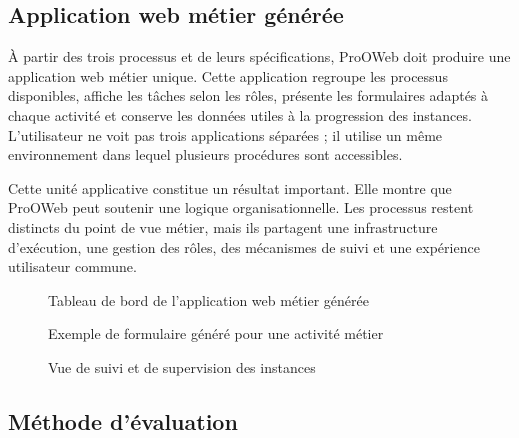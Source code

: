\subsection{Application web métier générée}

À partir des trois processus et de leurs spécifications, ProOWeb doit produire une application web métier unique. Cette application regroupe les processus disponibles, affiche les tâches selon les rôles, présente les formulaires adaptés à chaque activité et conserve les données utiles à la progression des instances. L'utilisateur ne voit pas trois applications séparées ; il utilise un même environnement dans lequel plusieurs procédures sont accessibles.

Cette unité applicative constitue un résultat important. Elle montre que ProOWeb peut soutenir une logique organisationnelle. Les processus restent distincts du point de vue métier, mais ils partagent une infrastructure d'exécution, une gestion des rôles, des mécanismes de suivi et une expérience utilisateur commune.

\begin{figure}[H]
\centering
{}
\caption{Tableau de bord de l'application web métier générée}
\label{fig:chap4-dashboard-genere}
\end{figure}

\begin{figure}[H]
\centering
{}
\caption{Exemple de formulaire généré pour une activité métier}
\label{fig:chap4-formulaire-genere}
\end{figure}

\begin{figure}[H]
\centering
{}
\caption{Vue de suivi et de supervision des instances}
\label{fig:chap4-supervision-generee}
\end{figure}

\label{sec:chap4-evaluation}

\subsection{Méthode d'évaluation}

